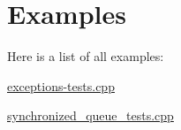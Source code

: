 \section{Examples}
Here is a list of all examples\+:\begin{DoxyCompactItemize}
\item 
\hyperlink{exceptions-tests_8cpp-example}{exceptions-\/tests.\+cpp}
\item 
\hyperlink{synchronized_queue_tests_8cpp-example}{synchronized\+\_\+queue\+\_\+tests.\+cpp}
\end{DoxyCompactItemize}
